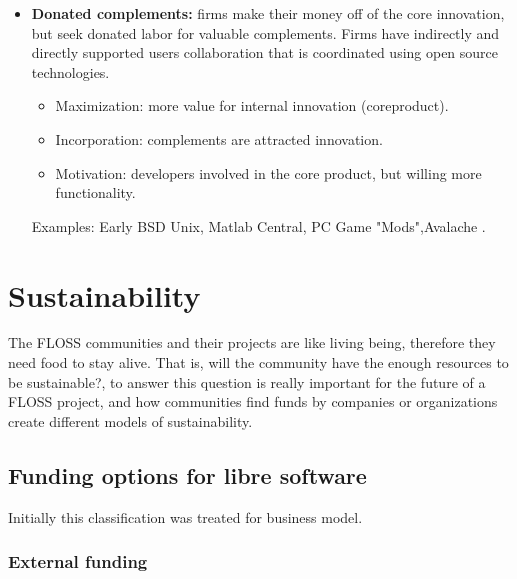 \begin{itemize}
 \item \textbf{Donated complements:} firms make their money off of the core innovation, but seek donated labor for valuable complements. Firms have indirectly and directly supported users collaboration that is coordinated using open source technologies.

	\begin{itemize}
		\item Maximization: more value for internal innovation (coreproduct).
		\item Incorporation: complements are attracted innovation.
		\item Motivation: developers involved in the core product, but willing more functionality.
	\end{itemize}
Examples: Early BSD Unix, Matlab Central, PC Game "Mods",Avalache .
\end{itemize}

 
 \section{Sustainability}\label{Sustainability}
The FLOSS communities and their projects are like living being, therefore they need food to stay alive. That is, will the community have the enough resources to be sustainable?, to answer this question is really important for the future of a FLOSS project, and how communities find funds by companies or organizations create different models of sustainability. 
  
 	\subsection{Funding options for libre software}\label{Funding options for libre software}
 	Initially this classification was treated for business model.
 
		\subsubsection{External funding}
		
